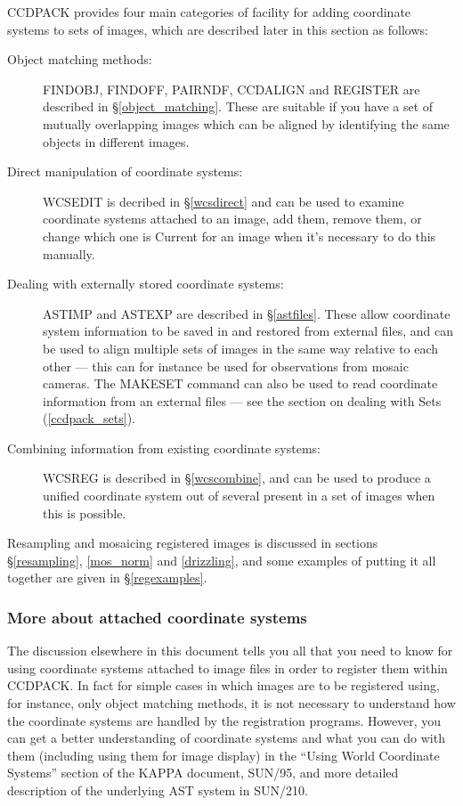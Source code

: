 \documentclass[twoside,11pt]{article}
\newcommand{\hyperref}[4]{#2\ref{#4}#3}
\newcommand{\xref}[3]{#1}
\renewcommand{\_}{\texttt{\symbol{95}}}
\newcommand{\routine}[1]{{\sc #1}}
\begin{document}
CCDPACK provides four main categories of facility 
for adding coordinate systems to sets of images, 
which are described later in this section as follows:
\begin{description}
\item[Object matching methods:]
\routine{FINDOBJ}, \routine{FINDOFF}, \routine{PAIRNDF}, \routine{CCDALIGN}
and \routine{REGISTER} are described 
\hyperref{here}{in \S}{}{object_matching}.
These are suitable if you have a set of mutually overlapping images
which can be aligned by identifying the same objects in different images.
%
\item[Direct manipulation of coordinate systems:]
\routine{WCSEDIT} is decribed 
\hyperref{here}{in \S}{}{wcsdirect} and
can be used to examine coordinate systems attached to an image, 
add them, remove them, or change which one is Current for an image when 
it's necessary to do this manually.
%
\item[Dealing with externally stored coordinate systems:]
\routine{ASTIMP} and \routine{ASTEXP} are described 
\hyperref{here}{in \S}{}{astfiles}.
These allow coordinate system information to be saved in and restored
from external files, and can be used to align multiple sets of images 
in the same way relative to each other --- this can for instance be
used for observations from mosaic cameras.
The \routine{MAKESET} command can also be used to read coordinate
information from an external files --- 
see the section on dealing with Sets (\ref{ccdpack_sets}).
\
%
\item[Combining information from existing coordinate systems:]
\routine{WCSREG} is described
\hyperref{here}{in \S}{}{wcscombine},
and can be used to produce a unified coordinate system out of several
present in a set of images when this is possible.
\end{description}
Resampling and mosaicing registered images is discussed in 
sections \S\ref{resampling}, \ref{mos_norm} and \ref{drizzling},
and some examples of putting it all together are given in 
\S\ref{regexamples}.


\subsubsection{More about attached coordinate systems}

The discussion elsewhere in this document tells you all 
that you need to know
for using coordinate systems attached to image files
in order to register them within CCDPACK.
In fact for simple cases in which images are to be registered using,
for instance, only object matching methods, it is not necessary to
understand how the coordinate systems are handled by the registration
programs.
However, you can get a better understanding of coordinate systems
and what you can do with them (including using them for image display)
in the ``\xref{Using World Coordinate Systems}{sun95}{se_wcsuse}''
section of the KAPPA document, \xref{SUN/95}{sun95}{},
and more detailed description of the underlying AST system in 
\xref{SUN/210}{sun210}{}.
\end{document}
